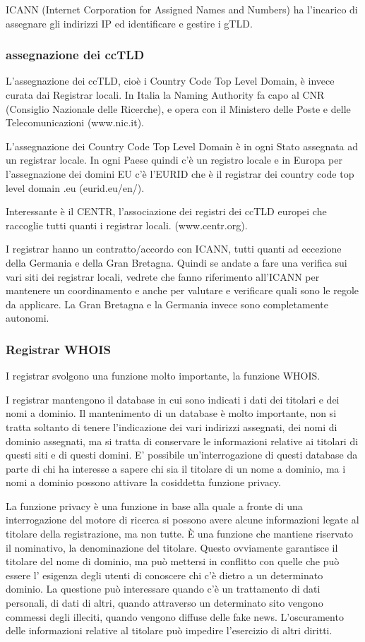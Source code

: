 ICANN (Internet Corporation for Assigned Names and Numbers) ha l'incarico di assegnare gli indirizzi IP ed identificare e gestire i gTLD.

\subsubsection{assegnazione dei ccTLD}

L'assegnazione dei ccTLD, cioè i Country Code Top Level Domain, è invece curata dai Registrar locali. In Italia la Naming Authority fa capo al CNR (Consiglio Nazionale delle Ricerche), e opera con il Ministero delle Poste e delle Telecomunicazioni (www.nic.it).

L'assegnazione dei Country Code Top Level Domain è in ogni Stato assegnata ad un registrar locale. In ogni Paese quindi c'è un registro locale e in Europa per l'assegnazione dei domini EU c'è l'EURID che è il registrar dei country code top level domain .eu (eurid.eu/en/).

Interessante è il CENTR, l'associazione dei registri dei ccTLD europei che raccoglie tutti quanti i registrar locali. (www.centr.org).

I registrar hanno un contratto/accordo con ICANN, tutti quanti ad eccezione della Germania e della Gran Bretagna. Quindi se andate a fare una verifica sui vari siti dei registrar locali, vedrete che fanno riferimento all'ICANN per mantenere un coordinamento e anche per valutare e verificare quali sono le regole da applicare. La Gran Bretagna e la Germania invece sono completamente autonomi.

\subsubsection{Registrar WHOIS}
I registrar svolgono una funzione molto importante, la funzione WHOIS. 

I registrar mantengono il database in cui sono indicati i dati dei titolari e dei nomi a dominio. Il mantenimento di un database è molto importante, non si tratta soltanto di tenere l'indicazione dei vari indirizzi assegnati, dei nomi di dominio assegnati, ma si tratta di conservare le informazioni relative ai titolari di questi siti e di questi domini. E' possibile un'interrogazione di questi database da parte di chi ha interesse a sapere chi sia il titolare di un nome a dominio, ma i nomi a dominio possono attivare la cosiddetta funzione privacy. 

La funzione privacy è una funzione in base alla quale a fronte di una interrogazione del motore di ricerca si possono avere alcune informazioni legate al titolare della registrazione, ma non tutte. È una funzione che mantiene riservato il nominativo, la denominazione del titolare. Questo ovviamente garantisce il titolare del nome di dominio, ma può mettersi in conflitto con quelle che può essere l' esigenza degli utenti di conoscere chi c'è dietro a un determinato dominio. La questione può interessare quando c'è un trattamento di dati personali, di dati di altri, quando attraverso un determinato sito vengono commessi degli illeciti, quando vengono diffuse delle fake news. L'oscuramento delle informazioni relative al titolare può impedire l'esercizio di altri diritti. 

